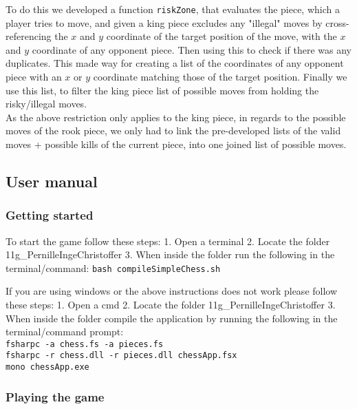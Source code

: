 \documentclass[a4paper]{report}
\begin{document}
To do this we developed a function \texttt{riskZone}, that evaluates the piece, which a player tries to move, and given a king piece excludes any "illegal" moves by cross-referencing the $x$ and $y$ coordinate of the target position of the move, with the $x$ and $y$ coordinate of any opponent piece. Then using this to check if there was any duplicates. This made way for creating a list of the coordinates of any opponent piece with an $x$ or $y$ coordinate matching those of the target position. Finally we use this list, to filter the king piece list of possible moves from holding the risky/illegal moves.\\

As the above restriction only applies to the king piece, in regards to the possible moves of the rook piece, we only had to link the pre-developed lists of the valid moves + possible kills of the current piece, into one joined list of possible moves.



\subsection*{User manual}

\subsubsection*{Getting started}

To start the game follow these steps:
1. Open a terminal
2. Locate the folder 11g\_PernilleIngeChristoffer
3. When inside the folder run the following in the terminal/command: \texttt{bash compileSimpleChess.sh}

If you are using windows or the above instructions does not work please follow these steps:
1. Open a cmd
2. Locate the folder  11g\_PernilleIngeChristoffer
3. When inside the folder compile the application by running the following in the terminal/command prompt:\\
\texttt{fsharpc -a chess.fs -a pieces.fs}\\
\texttt{fsharpc -r chess.dll -r pieces.dll chessApp.fsx}\\
\texttt{mono chessApp.exe}

\subsubsection*{Playing the game}
\end{document}
